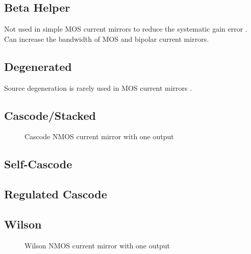\documentclass{article}[11pt]
\begin{document}
\subsection{Beta Helper}

\cite{payne-spreadsheet-91,smith-spreadsheet-91,stockstad-rropamp-02}

Not used in simple MOS current mirrors to reduce the systematic gain 
error \cite[section 4.2.3.2]{gray-anadesic-09}.
Can increase the bandwidth of MOS and bipolar current mirrors.


\subsection{Degenerated}

\cite[section 3.5]{johnsmartin-aicd-12}

Source degeneration is rarely used in MOS current mirrors
\cite[section 4.2.4.2]{gray-anadesic-09}.

\subsection{Cascode/Stacked}

\cite[section 3.6]{johnsmartin-aicd-12}

\begin{figure}[H]
  \centering
  \begin{circuitikz}
    
  \end{circuitikz}
  \caption{Cascode NMOS current mirror with one output}
  \label{fig:casc-nmos-1}
\end{figure}

\subsection{Self-Cascode}
\cite{self-cascode}

\subsection{Regulated Cascode}

\cite{sackinger-rgc-90}
\cite{coban-rrop-94}
\cite{helfenstein-gainboostop-95}

\subsection{Wilson}

\begin{figure}[H]
  \centering
  \begin{circuitikz}
        
  \end{circuitikz}
  \caption{Wilson NMOS current mirror with one output}
  \label{fig:classic-nmos-1}
\end{figure}
\end{document}
